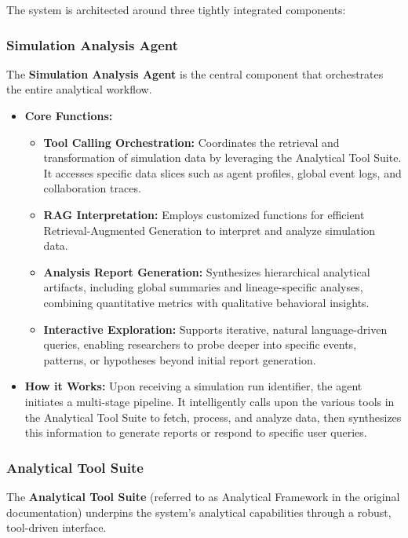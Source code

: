 The system is architected around three tightly integrated components:

\subsubsection{Simulation Analysis Agent}

The \textbf{Simulation Analysis Agent} is the central component that orchestrates the entire analytical workflow.

\begin{itemize}
    \item \textbf{Core Functions:}
    \begin{itemize}
        \item \textbf{Tool Calling Orchestration:} Coordinates the retrieval and transformation of simulation data by leveraging the Analytical Tool Suite. It accesses specific data slices such as agent profiles, global event logs, and collaboration traces.
        \item \textbf{RAG Interpretation:} Employs customized functions for efficient Retrieval-Augmented Generation to interpret and analyze simulation data.
        \item \textbf{Analysis Report Generation:} Synthesizes hierarchical analytical artifacts, including global summaries and lineage-specific analyses, combining quantitative metrics with qualitative behavioral insights.
        \item \textbf{Interactive Exploration:} Supports iterative, natural language-driven queries, enabling researchers to probe deeper into specific events, patterns, or hypotheses beyond initial report generation.
    \end{itemize}
    \item \textbf{How it Works:}
    Upon receiving a simulation run identifier, the agent initiates a multi-stage pipeline. It intelligently calls upon the various tools in the Analytical Tool Suite to fetch, process, and analyze data, then synthesizes this information to generate reports or respond to specific user queries.
\end{itemize}

\subsubsection{Analytical Tool Suite}

The \textbf{Analytical Tool Suite} (referred to as Analytical Framework in the original documentation) underpins the system's analytical capabilities through a robust, tool-driven interface.

